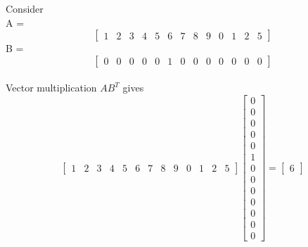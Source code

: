 \documentclass[journal,12pt,twocolumn]{IEEEtran}
\begin{document}
Consider
\\ 
A = 
\[
	\begin{bmatrix}
		1 & 2 & 3 & 4 & 5 & 6 & 7 & 8 & 9 & 0 & 1 & 2 & 5
	\end{bmatrix}
\]
B = 
\[
	\begin{bmatrix}
		0 & 0 & 0 & 0 & 0 & 1 & 0 & 0 & 0 & 0 & 0 & 0 & 0
	\end{bmatrix}
\]
\\
Vector multiplication $AB^{T}$ gives \\
\[
	\begin{bmatrix}
		1 & 2 & 3 & 4 & 5 & 6 & 7 & 8 & 9 & 0 & 1 & 2 & 5
	\end{bmatrix}
	\begin{bmatrix}
		0
		\\
		0
		\\
		0
		\\
		0
		\\
		0
		\\
		1
		\\
		0
		\\
		0
		\\
		0
		\\
		0
		\\
		0
		\\
		0
		\\
		0
	\end{bmatrix}
=
	\begin{bmatrix}
	6 
	\end{bmatrix}
\]
\end{document}
